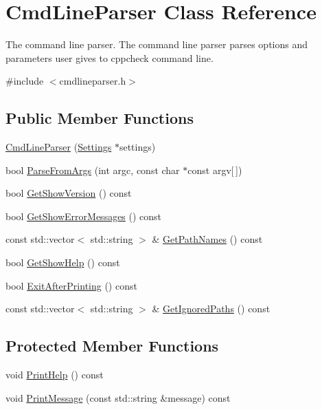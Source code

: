 \hypertarget{class_cmd_line_parser}{\section{Cmd\-Line\-Parser Class Reference}
\label{class_cmd_line_parser}
}


The command line parser. The command line parser parses options and parameters user gives to cppcheck command line.  




{\ttfamily \#include $<$cmdlineparser.\-h$>$}

\subsection*{Public Member Functions}
\begin{DoxyCompactItemize}
\item 
\hyperlink{class_cmd_line_parser_a35cf2b4e9957d7efa5f632cdbe296eb8}{Cmd\-Line\-Parser} (\hyperlink{class_settings}{Settings} $\ast$settings)
\item 
bool \hyperlink{class_cmd_line_parser_a21b1b71d5467c65ff080d6f749e3e8a0}{Parse\-From\-Args} (int argc, const char $\ast$const argv\mbox{[}$\,$\mbox{]})
\item 
bool \hyperlink{class_cmd_line_parser_adad5fd9ca2d5aa03e1ac5ef0278c1c3d}{Get\-Show\-Version} () const 
\item 
bool \hyperlink{class_cmd_line_parser_a741187e71509d8006dd7fc7475d904d0}{Get\-Show\-Error\-Messages} () const 
\item 
const std\-::vector$<$ std\-::string $>$ \& \hyperlink{class_cmd_line_parser_acd4074503fbc468deb4f69b81849886f}{Get\-Path\-Names} () const 
\item 
bool \hyperlink{class_cmd_line_parser_a0e6fb7e1e655e8c4ceafaa0b931cac25}{Get\-Show\-Help} () const 
\item 
bool \hyperlink{class_cmd_line_parser_a1068e1c89220e5db58239630a2f3a7e0}{Exit\-After\-Printing} () const 
\item 
const std\-::vector$<$ std\-::string $>$ \& \hyperlink{class_cmd_line_parser_a59f33c753d665b72c6ba98cddad15550}{Get\-Ignored\-Paths} () const 
\end{DoxyCompactItemize}
\subsection*{Protected Member Functions}
\begin{DoxyCompactItemize}
\item 
void \hyperlink{class_cmd_line_parser_a70917c357d33a443d5b2cd597b0d753b}{Print\-Help} () const 
\item 
void \hyperlink{class_cmd_line_parser_a147bcc41328323824d375dc0a3b9d7b3}{Print\-Message} (const std\-::string \&message) const 
\end{DoxyCompactItemize}


